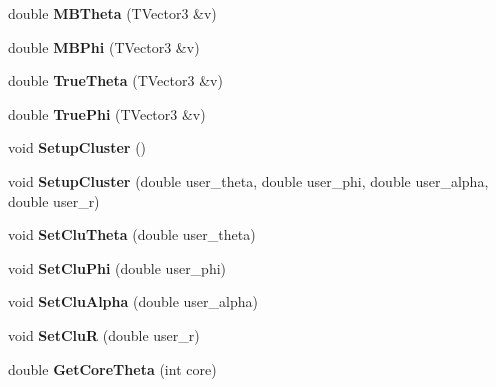 \begin{DoxyCompactItemize}
double {\bfseries M\+B\+Theta} (T\+Vector3 \&v)
\item 
\mbox{\label{class_m_b_geometry_a399568d67bb83801ef6a2dbe963a535e}} 
double {\bfseries M\+B\+Phi} (T\+Vector3 \&v)
\item 
\mbox{\label{class_m_b_geometry_afd393f9db7182de7fb19f0c934edb383}} 
double {\bfseries True\+Theta} (T\+Vector3 \&v)
\item 
\mbox{\label{class_m_b_geometry_a718d9c7fcc4a5fb8b9ecaabdc7a0503f}} 
double {\bfseries True\+Phi} (T\+Vector3 \&v)
\item 
\mbox{\label{class_m_b_geometry_a4d98a38f0dc1ca6a4a73477dde5cdd8d}} 
void {\bfseries Setup\+Cluster} ()
\item 
\mbox{\label{class_m_b_geometry_a93f157cebad3f63dbbefb5b08f3555af}} 
void {\bfseries Setup\+Cluster} (double user\+\_\+theta, double user\+\_\+phi, double user\+\_\+alpha, double user\+\_\+r)
\item 
\mbox{\label{class_m_b_geometry_a9a2a8c9609141be92d7ba30e6087aa30}} 
void {\bfseries Set\+Clu\+Theta} (double user\+\_\+theta)
\item 
\mbox{\label{class_m_b_geometry_a74142f84cf6317d52ae39c0e0ff8a87e}} 
void {\bfseries Set\+Clu\+Phi} (double user\+\_\+phi)
\item 
\mbox{\label{class_m_b_geometry_a0d4868b0360a6e5534918a9813540015}} 
void {\bfseries Set\+Clu\+Alpha} (double user\+\_\+alpha)
\item 
\mbox{\label{class_m_b_geometry_a292c4326421c78871667e91c3694ae35}} 
void {\bfseries Set\+CluR} (double user\+\_\+r)
\item 
\mbox{\label{class_m_b_geometry_a42aa536f15017724812712b0f8a77c12}} 
double {\bfseries Get\+Core\+Theta} (int core)
\item 
\mbox{\label{class_m_b_geometry_a39f685610ae0e68e547a46f8ef992599}} 

\end{DoxyCompactItemize}
